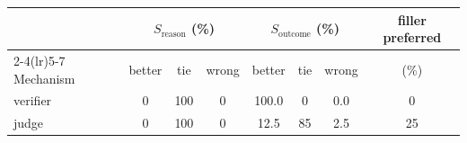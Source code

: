 \begin{tabular}{@{}lccccccc@{}}
\toprule
 & \multicolumn{3}{c}{$S_{\text{reason}}$ (\%)} & \multicolumn{3}{c}{$S_{\text{outcome}}$ (\%)} & filler preferred \\
\cmidrule(lr){2-4}\cmidrule(lr){5-7}
Mechanism & better & tie & wrong & better & tie & wrong & (\%) \\
\midrule
verifier & 0 & 100 & 0 & 100.0 & 0 & 0.0 & 0 \\
judge & 0 & 100 & 0 & 12.5 & 85 & 2.5 & 25 \\
\bottomrule
\end{tabular}
